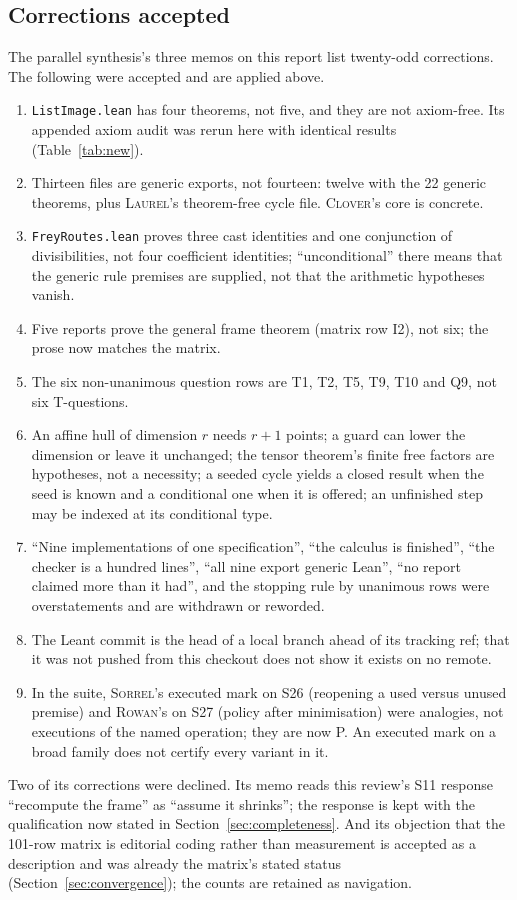 \documentclass[11pt,a4paper]{article}
\newcommand{\code}[1]{\nolinkurl{#1}}
\newcommand{\Cl}{\textsc{Clover}}
\newcommand{\La}{\textsc{Laurel}}
\newcommand{\Ro}{\textsc{Rowan}}
\newcommand{\So}{\textsc{Sorrel}}
\theoremstyle{definition}
\theoremstyle{plain}
\begin{document}
\subsection{Corrections accepted}
The parallel synthesis's three memos on this report list twenty-odd corrections. The following were accepted and are applied above.
\begin{enumerate}
\item \code{ListImage.lean} has four theorems, not five, and they are not axiom-free. Its appended axiom audit was rerun here with identical results (Table~\ref{tab:new}).
\item Thirteen files are generic exports, not fourteen: twelve with the 22 generic theorems, plus \La's theorem-free cycle file. \Cl's core is concrete.
\item \code{FreyRoutes.lean} proves three cast identities and one conjunction of divisibilities, not four coefficient identities; ``unconditional'' there means that the generic rule premises are supplied, not that the arithmetic hypotheses vanish.
\item Five reports prove the general frame theorem (matrix row I2), not six; the prose now matches the matrix.
\item The six non-unanimous question rows are T1, T2, T5, T9, T10 and Q9, not six T-questions.
\item An affine hull of dimension $r$ needs $r+1$ points; a guard can lower the dimension or leave it unchanged; the tensor theorem's finite free factors are hypotheses, not a necessity; a seeded cycle yields a closed result when the seed is known and a conditional one when it is offered; an unfinished step may be indexed at its conditional type.
\item ``Nine implementations of one specification'', ``the calculus is finished'', ``the checker is a hundred lines'', ``all nine export generic Lean'', ``no report claimed more than it had'', and the stopping rule by unanimous rows were overstatements and are withdrawn or reworded.
\item The Leant commit is the head of a local branch ahead of its tracking ref; that it was not pushed from this checkout does not show it exists on no remote.
\item In the suite, \So's executed mark on S26 (reopening a used versus unused premise) and \Ro's on S27 (policy after minimisation) were analogies, not executions of the named operation; they are now P. An executed mark on a broad family does not certify every variant in it.
\end{enumerate}
Two of its corrections were declined. Its memo reads this review's S11 response ``recompute the frame'' as ``assume it shrinks''; the response is kept with the qualification now stated in Section~\ref{sec:completeness}. And its objection that the 101-row matrix is editorial coding rather than measurement is accepted as a description and was already the matrix's stated status (Section~\ref{sec:convergence}); the counts are retained as navigation.
\end{document}
